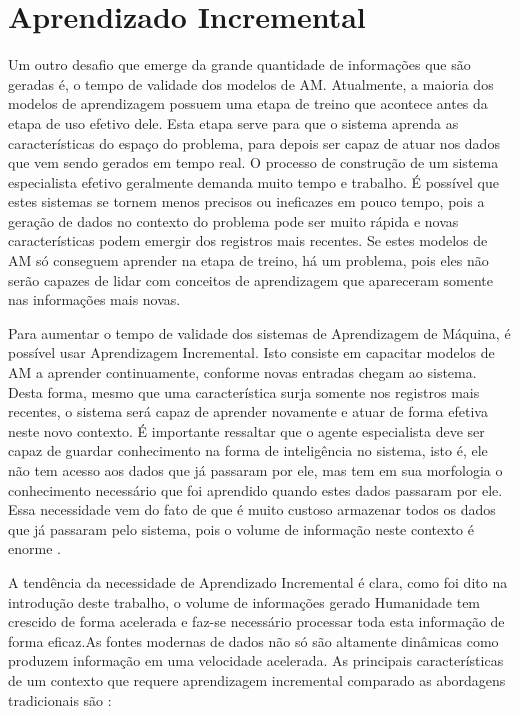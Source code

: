 \chapter{Aprendizado Incremental}
Um outro desafio que emerge da grande quantidade de informações que são geradas é, o tempo de validade dos modelos de AM. Atualmente, a maioria dos modelos de aprendizagem possuem uma etapa de treino que acontece antes da etapa de uso efetivo dele. Esta etapa serve para que o sistema aprenda as características do espaço do problema, para depois ser capaz de atuar nos dados que vem sendo gerados em tempo real. 
O processo de construção de um sistema especialista efetivo geralmente demanda muito tempo e trabalho. É possível que estes sistemas se tornem menos precisos ou ineficazes em pouco tempo, pois a geração de dados no contexto do problema pode ser muito rápida e novas características podem emergir dos registros mais recentes. Se estes modelos de AM só conseguem aprender na etapa de treino, há um problema, pois eles não serão capazes de lidar com conceitos de aprendizagem que apareceram somente nas informações mais novas. 

Para aumentar o tempo de validade dos sistemas de Aprendizagem de Máquina, é possível usar Aprendizagem Incremental. Isto consiste em capacitar modelos de AM a aprender continuamente, conforme novas entradas chegam ao sistema. Desta forma, mesmo que uma característica surja somente nos registros mais recentes, o sistema será capaz de aprender novamente e atuar de forma efetiva neste novo contexto. É importante ressaltar que o agente especialista deve ser capaz de guardar conhecimento na forma de inteligência no sistema, isto é, ele não tem acesso aos dados que já passaram por ele, mas tem em sua morfologia o conhecimento necessário que foi aprendido quando estes dados passaram por ele. Essa necessidade vem do fato de que é muito custoso armazenar todos os dados que já passaram pelo sistema, pois o volume de informação neste contexto é enorme \cite{incremental2011}.

A tendência da necessidade de Aprendizado Incremental é clara, como foi dito na introdução deste trabalho, o volume de informações gerado Humanidade tem crescido de forma acelerada e faz-se necessário processar toda esta informação de forma eficaz.As fontes modernas de dados não só são altamente dinâmicas como produzem informação em uma velocidade acelerada. As principais características de um contexto que requere aprendizagem incremental comparado as abordagens tradicionais são \cite{batch2013}:

